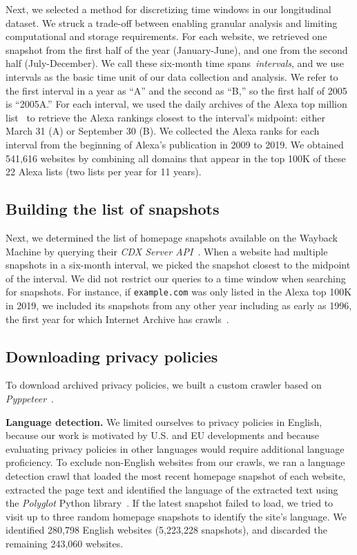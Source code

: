 Next, we selected a method for discretizing time windows in our longitudinal dataset. We struck a trade-off between enabling granular analysis and limiting computational and storage requirements. For each website, we retrieved one snapshot from the first half of the year (January-June), and one from the second half (July-December). We call these six-month time spans~\emph{intervals}, and we use intervals as the basic time unit of our data collection and analysis. We refer to the first interval in a year as ``A'' and the second as ``B,'' so the first half of 2005 is ``2005A.''
For each interval, we used the daily archives of the Alexa top million list~\cite{naab2019prefix} to retrieve the Alexa rankings closest to the interval's midpoint: either March 31 (A) or September 30 (B).
We collected the Alexa ranks for each interval from the beginning of Alexa’s publication in 2009 to 2019.
We obtained 541,616 websites by combining all domains that appear in the top 100K of these 22 Alexa lists (two lists per year for 11 years).

\subsection{Building the list of snapshots}
\label{sec:sec:snapshot-retrieval}
Next, we determined the list of homepage snapshots available on the Wayback Machine
by querying their \emph{CDX Server API}~\cite{wayback-cdx-api}.
When a website had multiple snapshots in a six-month interval, we picked the snapshot closest to the midpoint of the interval.
We did not restrict our queries to a time window when searching for snapshots.
For instance, if {\tt example.com} was only listed in the Alexa top 100K in 2019,
we included its snapshots from any other year including as early as 1996, the first year for which Internet Archive has crawls~\cite{WaybackMachineGeneralInformation}.

\subsection{Downloading privacy policies}
\label{sec:sec:download-policies}
To download archived privacy policies, we built a custom crawler based on 
\emph{Pyppeteer}~\cite{miyakogi2019May}.


{\textbf{Language detection.}}
We limited ourselves to privacy policies in English, because our work is motivated by U.S. and EU developments and because evaluating privacy policies in other languages would require additional language proficiency. To exclude non-English websites from our crawls, we ran a language detection crawl that loaded the most recent homepage snapshot of each website, extracted the page text and identified the language of the extracted text using the \emph{Polyglot} Python library~\cite{polyglot-pypi}. If the latest snapshot failed to load, we tried to visit up to three random homepage snapshots to identify the site's language. 
We identified 280,798 English websites (5,223,228 snapshots),
and discarded the remaining 243,060 websites.


